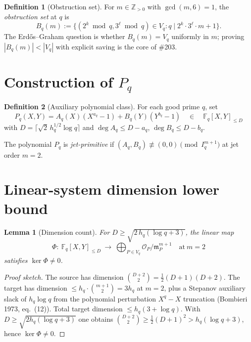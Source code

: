 \documentclass[12pt]{amsart}
\newtheorem{lemma}{Lemma}
\theoremstyle{definition}
\newtheorem{definition}{Definition}
\theoremstyle{remark}
\begin{document}
\begin{definition}[Obstruction set]
For $m \in \mathbb{Z}_{>0}$ with $\gcd(m, 6) = 1$, the
\emph{obstruction set} at $q$ is
$$
B_q(m) := \{(2^k \bmod q, 3^\ell \bmod q) \in V_q :
q \mid 2^k \cdot 3^\ell \cdot m + 1\}.
$$
The Erd\H{o}s--Graham question is whether $B_q(m) = V_q$ uniformly in $m$;
proving $|B_q(m)| < |V_q|$ with explicit saving is the core of \#203.
\end{definition}

\section{Construction of $P_q$}

\begin{definition}[Auxiliary polynomial class]
For each good prime $q$, set
$$
P_q(X, Y) = A_q(X) (X^{a_q} - 1) + B_q(Y) (Y^{b_q} - 1)
\quad\in\quad \mathbb{F}_q[X, Y]_{\le D}
$$
with $D = \lceil \sqrt{2}\, h_q^{1/2} \log q \rceil$ and
$\deg A_q \le D - a_q$, $\deg B_q \le D - b_q$.

The polynomial $P_q$ is \emph{jet-primitive} if
$(A_q, B_q) \not\equiv (0, 0) \pmod{I_q^{m+1}}$ at jet order $m = 2$.
\end{definition}

\section{Linear-system dimension lower bound}

\begin{lemma}[Dimension count]\label{lem:dim}
For $D \ge \sqrt{2\, h_q (\log q + 3)}$, the linear map
$$
\Phi:\ \mathbb{F}_q[X, Y]_{\le D}\ \longrightarrow\
\bigoplus_{P \in V_q} \mathcal{O}_P / \mathfrak{m}_P^{m+1}
\quad\text{at}\ m = 2
$$
satisfies $\ker \Phi \neq 0$.
\end{lemma}

\begin{proof}[Proof sketch]
The source has dimension
$\binom{D+2}{2} = \tfrac{1}{2}(D+1)(D+2)$.
The target has dimension $\le h_q \cdot \binom{m+1}{2} = 3 h_q$ at $m = 2$,
plus a Stepanov auxiliary slack of $h_q \log q$ from the polynomial
perturbation $X^q - X$ truncation (Bombieri 1973, eq.\ (12)).
Total target dimension $\le h_q (3 + \log q)$.
With $D \ge \sqrt{2 h_q (\log q + 3)}$ one obtains
$\binom{D+2}{2} \ge \tfrac{1}{2}(D+1)^2 > h_q(\log q + 3)$,
hence $\ker \Phi \ne 0$.
\qedhere
\end{proof}
\end{document}
